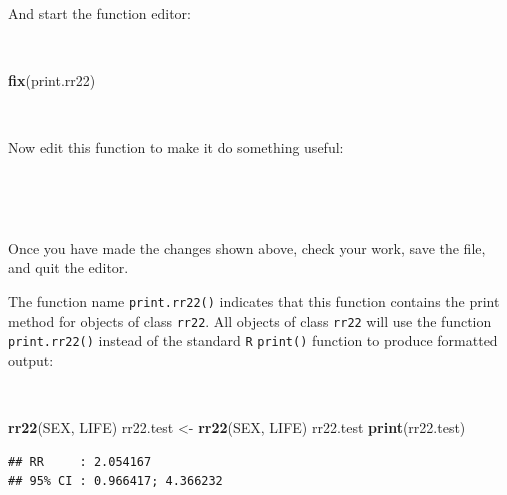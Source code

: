\documentclass[12pt,a4paper]{book}
\newenvironment{Shaded}{\begin{snugshade}}{\end{snugshade}}
\newcommand{\KeywordTok}[1]{\textcolor[rgb]{0.13,0.29,0.53}{\textbf{#1}}}
\newcommand{\DataTypeTok}[1]{\textcolor[rgb]{0.13,0.29,0.53}{#1}}
\newcommand{\DecValTok}[1]{\textcolor[rgb]{0.00,0.00,0.81}{#1}}
\newcommand{\CharTok}[1]{\textcolor[rgb]{0.31,0.60,0.02}{#1}}
\newcommand{\StringTok}[1]{\textcolor[rgb]{0.31,0.60,0.02}{#1}}
\newcommand{\ControlFlowTok}[1]{\textcolor[rgb]{0.13,0.29,0.53}{\textbf{#1}}}
\newcommand{\OperatorTok}[1]{\textcolor[rgb]{0.81,0.36,0.00}{\textbf{#1}}}
\newcommand{\NormalTok}[1]{#1}
\theoremstyle{definition}
\theoremstyle{definition}
\theoremstyle{definition}
\theoremstyle{remark}
\begin{document}
~

And start the function editor:

~

\begin{Shaded}
\begin{Highlighting}[]
\KeywordTok{fix}\NormalTok{(print.rr22)}
\end{Highlighting}
\end{Shaded}

~

Now edit this function to make it do something useful:

~

\begin{Shaded}
\end{Shaded}

~

Once you have made the changes shown above, check your work, save the
file, and quit the editor.

The function name \texttt{print.rr22()} indicates that this function
contains the print method for objects of class \texttt{rr22}. All
objects of class \texttt{rr22} will use the function
\texttt{print.rr22()} instead of the standard \texttt{R}
\texttt{print()} function to produce formatted output:

~

\begin{Shaded}
\begin{Highlighting}[]
\KeywordTok{rr22}\NormalTok{(SEX, LIFE)}
\NormalTok{rr22.test <-}\StringTok{ }\KeywordTok{rr22}\NormalTok{(SEX, LIFE)}
\NormalTok{rr22.test}
\KeywordTok{print}\NormalTok{(rr22.test)}
\end{Highlighting}
\end{Shaded}

\begin{verbatim}
## RR     : 2.054167
## 95% CI : 0.966417; 4.366232
\end{verbatim}
\end{document}
